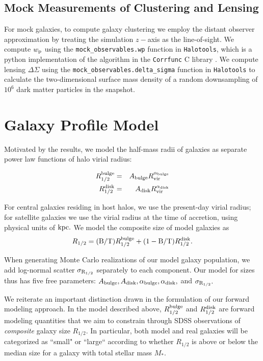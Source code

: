 \documentclass[usenatbib,usegraphicx,letterpaper]{mn2e}
\newcommand{\beq}{\begin{equation}}
\newcommand{\eeq}{\end{equation}}
\newcommand{\rhalf}{R_{1/2}}
\newcommand{\rhalfdisk}{R_{1/2}^{\rm disk}}
\newcommand{\rhalfbulge}{R_{1/2}^{\rm bulge}}
\newcommand{\adisk}{A_{\rm disk}}
\newcommand{\abulge}{A_{\rm bulge}}
\newcommand{\alphadisk}{\alpha_{\rm disk}}
\newcommand{\alphabulge}{\alpha_{\rm bulge}}
\newcommand{\sigmarhalf}{\sigma_{\rm R_{1/2}}}
\newcommand{\rvir}{R_{\rm vir}}
\newcommand{\bt}{{\rm B/T}}
\newcommand{\mstar}{M_{\ast}}
\newcommand{\wproj}{w_{\rm p}}
\newcommand{\kpc}{{\rm kpc}}
\begin{document}
\subsection{Mock Measurements of Clustering and Lensing}
\label{subsec:mock_measurements}

For mock galaxies, to compute galaxy clustering we employ the distant observer approximation by treating the simulation $z-$axis as the line-of-sight. We compute $\wproj$ using the {\tt mock\_observables.wp} function in {\tt Halotools}, which is a python implementation of the algorithm in the {\tt Corrfunc} C library \citep{sinha_etal17}. We compute lensing $\Delta\Sigma$ using the {\tt mock\_observables.delta\_sigma} function in {\tt Halotools} to calculate the two-dimensional surface mass density of a random downsampling of $10^6$ dark matter particles in the snapshot.


\section{Galaxy Profile Model}
\label{sec:model}

Motivated by the \citet{kravtsov13} results, we model the half-mass radii of galaxies as separate power law functions of halo virial radius:

\begin{eqnarray}
\label{eq:fiducial_model}
\rhalfbulge &=& \abulge\rvir^{\alphabulge} \\
\rhalfdisk &=& \adisk\rvir^{\alphadisk}
\end{eqnarray}

For central galaxies residing in host halos, we use the present-day virial radius; for satellite galaxies we use the virial radius at the time of accretion, using physical units of $\kpc.$ We model the composite size of model galaxies as
\beq
\rhalf = (\bt)\rhalfbulge + (1-\bt)\rhalfdisk.
\eeq

When generating Monte Carlo realizations of our model galaxy population, we add log-normal scatter $\sigmarhalf$ separately to each component. Our model for sizes thus has five free parameters: $\abulge, \adisk, \alphabulge, \alphadisk,$ and $\sigmarhalf.$

We reiterate an important distinction drawn in the formulation of our forward modeling approach. In the model described above, $\rhalfbulge$ and $\rhalfdisk$ are forward modeling quantities that we aim to constrain through SDSS observations of {\em composite} galaxy size $\rhalf.$ In particular, both model and real galaxies will be categorized as ``small" or ``large`` according to whether $\rhalf$ is above or below the median size for a galaxy with total stellar mass $\mstar.$
\end{document}
